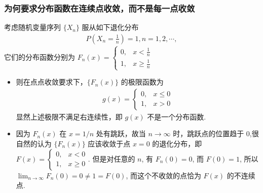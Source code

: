 \begin{frame}
	\frametitle{为何要求分布函数在连续点收敛，而不是每一点收敛}
	\begin{exam}
		考虑随机变量序列 $\{X_n\}$ 服从如下退化分布
		\begin{eqnarray*}
			P(X_n=\frac{1}{n})=1, n=1,2,\cdots,
		\end{eqnarray*}
		它们的分布函数分别为 $F_n (x)=\left\{
		\begin{array}{ll}
			0, & x<\frac{1}{n}\\
			1, &x\ge \frac{1}{n}
		\end{array}
		\right.$

		\pause
		\begin{itemize}[<+-|alert@+>]
			\item 则在点点收敛要求下，$\{F_n (x)\}$ 的极限函数为 \pause
			\begin{eqnarray*}
				g(x)=\left\{
				\begin{array}{ll}
					0, & x\le 0\\
					1, &x>0
				\end{array}
				\right.
			\end{eqnarray*}
			\pause 显然上述极限不满足右连续性，即 $g (x)$ 不是一个分布函数.\pause
			\item 因为 $F_n (x)$ 在 $x=1/n$ 处有跳跃，故当 $n\rightarrow\infty$ 时，跳跃点的位置趋于 0,\pause 很自然的认为 $\{F_n (x)\}$ 应该收敛于点 $x=0$ 的退化分布，即 $F (x)=\left\{
			\begin{array}{ll}
				0, & x<0\\
				1, &x\ge 0
			\end{array}
			\right.$. \pause 但是对任意的 $n$, 有 $F_n (0)=0$, 而 $F (0)=1$, 所以 $\lim_{n\rightarrow\infty} F_n (0)=0\neq 1=F (0)$, 而这个不收敛的点恰为 $F (x)$ 的不连续点.
		\end{itemize}
	\end{exam}
\end{frame}

